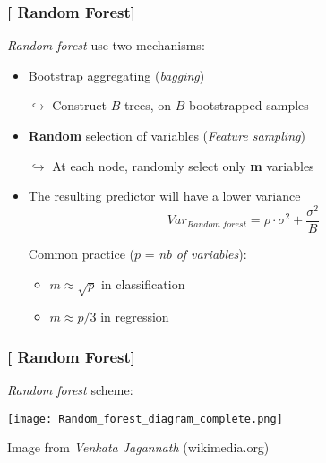 \documentclass[xcolor=x11names,compress, handhouts]{beamer}
\renewcommand{\(}{\begin{columns}}
\renewcommand{\)}{\end{columns}}
\newcommand{\<}[1]{\begin{column}{#1}}
\renewcommand{\>}{\end{column}}
\begin{document}
\begin{frame}
\frametitle{\textcolor{brique}{[ Random Forest]}}
\textit{Random forest} use two mechanisms:
\pause
\begin{itemize}[<+->]
    \item Bootstrap aggregating (\textit{bagging})
    \item[$\hookrightarrow$] Construct $B$ trees, on $B$ bootstrapped samples
    \item \textbf{Random} selection of variables (\textit{Feature sampling})
    \item[$\hookrightarrow$] At each node, randomly select only \textbf{m} variables 
    \item The resulting predictor will have a lower variance
    $$
Var_{Random \; forest} = \rho \cdot \sigma^{2} + \frac{\sigma^{2}}{B}
$$

    \item[]Common practice ($p$ =\textit{ nb of variables}):
    \begin{itemize}
        \item $m \approx \sqrt{p}$ in classification
        \item $m \approx p/3$ in regression
    \end{itemize}
\end{itemize}
\end{frame}


\begin{frame}
\frametitle{\textcolor{brique}{[ Random Forest]}}
\textit{Random forest} scheme:
\begin{center}
\texttt{[image: Random\_forest\_diagram\_complete.png]}\\
\end{center}
 \textcolor{gris}{\small Image from  \textit{Venkata Jagannath} (wikimedia.org) }
\end{frame}
\end{document}
